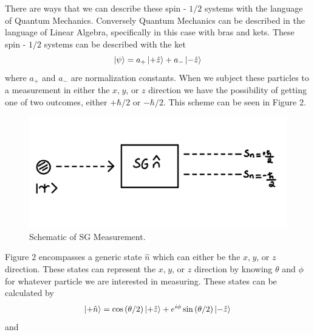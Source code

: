 \documentclass[twocolumn]{article}
\begin{document}
There are ways that we can describe these spin - $1/2$ systems with the language of Quantum Mechanics. Conversely Quantum Mechanics can be described in the language of Linear Algebra, specifically in this case with bras and kets. These spin - $1/2$ systems can be described with the ket 
\begin{equation} \label{eq:1}
\ket{\psi}=a_{+}\ket{+\hat{z}}+a_{-}\ket{-\hat{z}}
\end{equation}
where $a_{+}$ and $a_{-}$ are normalization constants. When we subject these particles to a measurement in either the $x, \hspace{1pt} y$, or $z$ direction we have the possibility of getting one of two outcomes, either $+\hbar/2$ or $-\hbar/2$. This scheme can be seen in Figure 2. 
\newpage
\begin{figure}[htpb]
\begin{center}
\includegraphics[width=0.90\linewidth]{SG-Measurement.PNG}
\caption{Schematic of SG Measurement.}
\end{center}
\end{figure}
Figure 2 encompasses a generic state $\hat{n}$ which can either be the $x, \hspace{1pt} y$, or $z$ direction. These states can represent the $x, \hspace{1pt} y$, or $z$ direction by knowing $\theta$ and $\phi$ for whatever particle we are interested in measuring. These states can be calculated by
\begin{equation} \label{eq:2}
\ket{+\hat{n}}=\cos{(\theta/2)}\ket{+\hat{z}}+e^{i\phi}\sin{(\theta/2)}\ket{-\hat{z}}
\end{equation}
and
\end{document}
